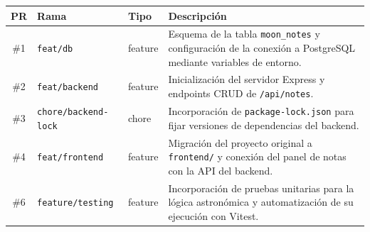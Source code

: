 \begin{center}
\begin{tabularx}{\textwidth}{@{}c l l >{\raggedright\arraybackslash}X@{}}
\toprule
\textbf{PR} & \textbf{Rama} & \textbf{Tipo} & \textbf{Descripción} \\
\midrule
\#1 & \texttt{feat/db} & \textcolor{gitfeat}{feature} & Esquema de la tabla \texttt{moon\_notes} y configuración de la conexión a PostgreSQL mediante variables de entorno. \\
\#2 & \texttt{feat/backend} & \textcolor{gitfeat}{feature} & Inicialización del servidor Express y endpoints CRUD de \texttt{/api/notes}. \\
\#3 & \texttt{chore/backend-lock} & \textcolor{gitchore}{chore} & Incorporación de \texttt{package-lock.json} para fijar versiones de dependencias del backend. \\
\#4 & \texttt{feat/frontend} & \textcolor{gitfeat}{feature} & Migración del proyecto original a \texttt{frontend/} y conexión del panel de notas con la API del backend. \\
\#6 & \texttt{feature/testing} & \textcolor{gitfeat}{feature} & Incorporación de pruebas unitarias para la lógica astronómica y automatización de su ejecución con Vitest. \\
\bottomrule
\end{tabularx}
\end{center}

